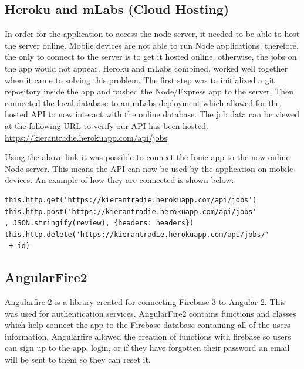 \subsection{Heroku and mLabs (Cloud Hosting)}
In order for the application to access the node server, it needed to be able to host the server online. Mobile devices are not able to run Node applications, therefore, the only to connect to the server is to get it hosted online, otherwise, the jobs on the app would not appear. Heroku and mLabs combined, worked well together when it came to solving this problem. The first step was to initialized a git repository inside the app and pushed the Node/Express app to the server. Then connected the local database to an mLabs deployment which allowed for the hosted API to now interact with the online database. The job data can be viewed at the following URL to verify our API has been hosted. 
 \url{ https://kierantradie.herokuapp.com/api/jobs}
 
Using the above link it was possible to connect the Ionic app to the now online Node server. This means the API can now be used by the application on mobile devices. An example of how they are connected is shown below: 
 
 
 \begin{verbatim}
this.http.get('https://kierantradie.herokuapp.com/api/jobs')
this.http.post('https://kierantradie.herokuapp.com/api/jobs'
, JSON.stringify(review), {headers: headers})
this.http.delete('https://kierantradie.herokuapp.com/api/jobs/'
 + id)
 \end{verbatim}
\subsection{AngularFire2}
Angularfire 2 is a library created for connecting Firebase 3 to Angular 2. This was used for authentication services. AngularFire2 contains functions and classes which help connect the app to the Firebase database containing all of the users information. Angularfire allowed the creation of functions with firebase so users can sign up to the app, login, or if they have forgotten their password an email will be sent to them so they can reset it.

